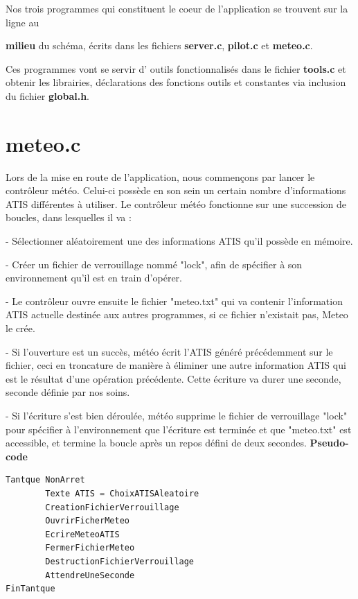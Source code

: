 \documentclass{report}
\begin{document}
		Nos trois programmes qui constituent le coeur de l'application se trouvent sur la ligne au {\textbf{milieu} du schéma, écrits dans les fichiers {\textbf{\color{red} server.c}}, {      \textbf{\color{red} pilot.c}} et {\textbf{\color{red} meteo.c}}.

		Ces programmes vont se servir d' \og outils \fg fonctionnalisés dans le fichier {\textbf{\color{red} tools.c}} et obtenir les librairies, déclarations des fonctions outils et constantes  via inclusion du fichier {\textbf{\color{black} global.h}}.

	\section{meteo.c}

		Lors de la mise en route de l'application, nous commençons par lancer le contrôleur météo.
		Celui-ci possède en son sein un certain nombre d'informations ATIS différentes à utiliser.
		Le contrôleur météo fonctionne sur une succession de boucles, dans lesquelles il va :

		- Sélectionner aléatoirement une des informations ATIS qu'il possède en mémoire.

		- Créer un fichier de verrouillage nommé "lock", afin de spécifier à son environnement qu'il est en train d'opérer.

		- Le contrôleur ouvre ensuite le fichier "meteo.txt" qui va contenir l'information ATIS actuelle destinée aux autres programmes, si ce fichier n'existait pas, Meteo le crée.

		- Si l'ouverture est un succès, météo écrit l'ATIS généré précédemment sur le fichier, ceci en troncature de manière à éliminer une autre information ATIS qui est le résultat d'une opération précédente. Cette écriture va durer une seconde, seconde définie par nos soins.

		- Si l'écriture s'est bien déroulée, météo supprime le fichier de verrouillage "lock" pour spécifier à l'environnement que l'écriture est terminée et que "meteo.txt" est accessible, et termine la boucle après un repos défini de deux secondes.
\clearpage
\textbf{Pseudo-code}

\begin{lstlisting}[language=C]
Tantque NonArret
		Texte ATIS = ChoixATISAleatoire
		CreationFichierVerrouillage
		OuvrirFicherMeteo
		EcrireMeteoATIS
		FermerFichierMeteo
		DestructionFichierVerrouillage
		AttendreUneSeconde
FinTantque 
\end{lstlisting}

}
\end{document}
